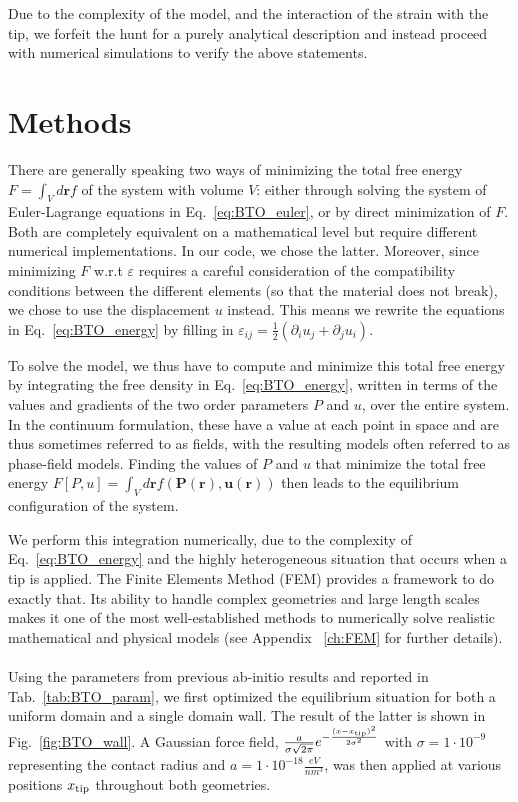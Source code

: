 Due to the complexity of the model, and the interaction of the strain with the tip, we forfeit the hunt for a purely analytical description and instead proceed with numerical simulations to verify the above statements.

\section{Methods \label{sec:BTO_methods}}
There are generally speaking two ways of minimizing the total free energy $F=\int_V d\bm{r} f$ of the system with volume $V$: either through solving the system of Euler-Lagrange equations in Eq.~\eqref{eq:BTO_euler}, or by direct minimization of $F$.
Both are completely equivalent on a mathematical level but require different numerical implementations.
In our code, we chose the latter.
Moreover, since minimizing $F$ w.r.t $\varepsilon$ requires a careful consideration of the compatibility conditions between the different elements (so that the material does not break)\cite{Marton2007}, we chose to use the displacement $u$ instead.
This means we rewrite the equations in Eq.~\eqref{eq:BTO_energy} by filling in $\varepsilon_{ij} = \frac{1}{2}(\partial_i u_j + \partial_j u_i)$.

To solve the model, we thus have to compute and minimize this total free energy by integrating the free density in Eq.~\eqref{eq:BTO_energy}, written in terms of the values and gradients of the two order parameters $P$ and $u$, over the entire system.
In the continuum formulation, these have a value at each point in space and are thus sometimes referred to as fields, with the resulting models often referred to as phase-field models.
Finding the values of $P$ and $u$ that minimize the total free energy $F[P,u]=\int_V d\bm{r} f(\bm{P}(\bm{r}),\bm{u}(\bm{r}))$ then leads to the equilibrium configuration of the system.

We perform this integration numerically, due to the complexity of Eq.~\eqref{eq:BTO_energy} and the highly heterogeneous situation that occurs when a tip is applied.
The Finite Elements Method (FEM) provides a framework to do exactly that.
Its ability to handle complex geometries and large length scales makes it one of the most well-established methods to numerically solve realistic mathematical and physical models (see Appendix ~\ref{ch:FEM} for further details).
\\\\
Using the parameters from previous ab-initio results \cite{Marton2010} and reported in Tab.~\ref{tab:BTO_param}, we first optimized the equilibrium situation for both a uniform domain and a single domain wall. The result of the latter is shown in Fig.~\ref{fig:BTO_wall}.
A Gaussian force field, $\frac{a}{\sigma \sqrt{2\pi}}e^{-\frac{(x-x_{\rm tip})^2}{2\sigma^2}}$ with $\sigma = 1 \cdot 10^{-9}$ representing the contact radius and $a = 1 \cdot 10^{-18} \frac{eV}{nm^3}$, was then applied at various positions $x_{\rm tip}$ throughout both geometries.

